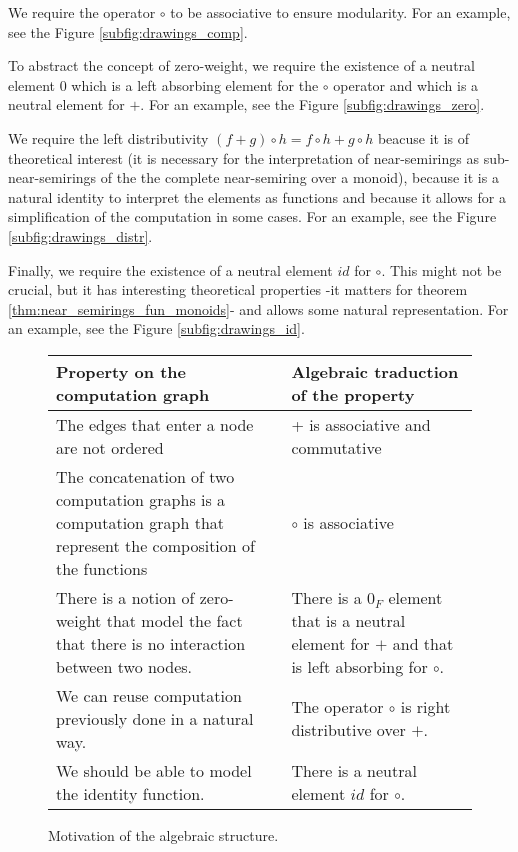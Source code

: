 \documentclass[11pt,a4paper]{article}
\theoremstyle{definition}
\begin{document}
	We require the operator $\circ$ to be associative to ensure modularity. For an example, see the Figure \ref{subfig:drawings_comp}.

	To abstract the concept of zero-weight, we require the existence of a neutral element $0$ which is a left absorbing element for the $\circ$ operator and which is a neutral element for $+$. For an example, see the Figure \ref{subfig:drawings_zero}.

	We require the left distributivity $(f+g) \circ h = f \circ h + g \circ h$ beacuse it is of theoretical interest (it is necessary for the interpretation of near-semirings as sub-near-semirings of the the complete near-semiring over a monoid), because it is a natural identity to interpret the elements as functions and because it allows for a simplification of the computation in some cases. For an example, see the Figure \ref{subfig:drawings_distr}.

	Finally, we require the existence of a neutral element $id$ for $\circ$. This might not be crucial, but it has interesting theoretical properties -it matters for theorem \ref{thm:near_semirings_fun_monoids}- and allows some natural representation. For an example, see the Figure \ref{subfig:drawings_id}.
	\\

	\begin{figure}
		\centering
		\begin{tabular}{|C{7.5cm}|C{7.5cm}|}
			\hline 
			\textbf{Property on the computation graph} & \textbf{Algebraic traduction of the property} \\ 
			\hline 
			The edges that enter a node are not ordered & + is associative and commutative \\ 
			\hline
			The concatenation of two computation graphs is a computation graph that represent the composition of the functions & $\circ$ is associative \\ 
			\hline 
			There is a notion of zero-weight that model the fact that there is no interaction between two nodes. & There is a $0_F$ element that is a neutral element for $+$ and that is left absorbing for $\circ$. \\ 
			\hline 
			We can reuse computation previously done in a natural way. & The operator $\circ$ is right distributive over $+$. \\ 
			\hline 
			We should be able to model the identity function. & There is a neutral element $id$ for $\circ$. \\ 
			\hline 
		\end{tabular} 
	\caption{Motivation of the algebraic structure.}
	\label{fig:table_algebraic_structure}
	\end{figure}
\end{document}
